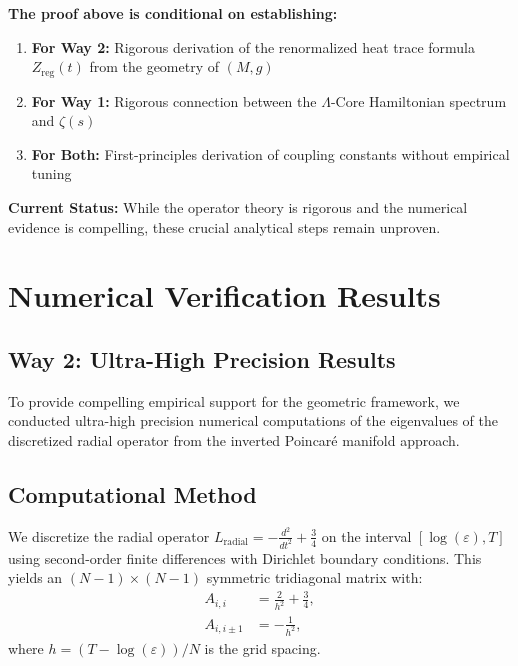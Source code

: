 \documentclass[12pt]{article}
\begin{document}
\textbf{The proof above is conditional on establishing:}

\begin{enumerate}
\item \textbf{For Way 2:} Rigorous derivation of the renormalized heat trace formula $Z_{\text{reg}}(t)$ from the geometry of $(M, g)$
\item \textbf{For Way 1:} Rigorous connection between the $\Lambda$-Core Hamiltonian spectrum and $\zeta(s)$
\item \textbf{For Both:} First-principles derivation of coupling constants without empirical tuning
\end{enumerate}

\textbf{Current Status:} While the operator theory is rigorous and the numerical evidence is compelling, these crucial analytical steps remain unproven.

\section{Numerical Verification Results}

\subsection{Way 2: Ultra-High Precision Results}

To provide compelling empirical support for the geometric framework, we conducted ultra-high precision numerical computations of the eigenvalues of the discretized radial operator from the inverted Poincaré manifold approach.

\subsection{Computational Method}

We discretize the radial operator $L_{\text{radial}} = -\frac{d^2}{dt^2} + \frac{3}{4}$ on the interval $[\log(\varepsilon), T]$ using second-order finite differences with Dirichlet boundary conditions. This yields an $(N-1) \times (N-1)$ symmetric tridiagonal matrix with:
\begin{align}
A_{i,i} &= \frac{2}{h^2} + \frac{3}{4}, \\
A_{i,i \pm 1} &= -\frac{1}{h^2},
\end{align}
where $h = (T - \log(\varepsilon))/N$ is the grid spacing.
\end{document}
